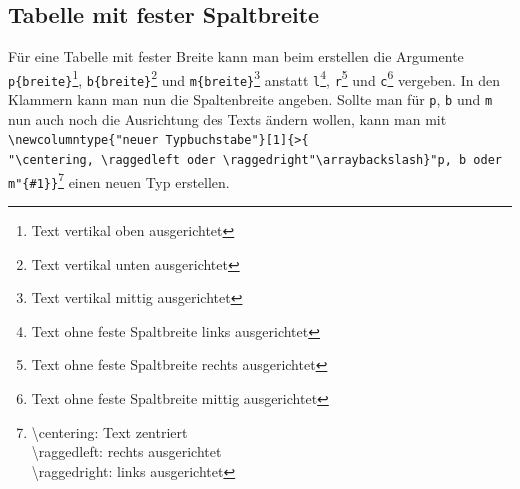 \documentclass[
12pt,
ngerman
]{scrreprt}
\begin{document}
\subsection{Tabelle mit fester Spaltbreite}
\label{subsec:table-col-fixed}
Für eine Tabelle mit fester Breite kann man beim erstellen die Argumente \verb!p{breite}!\footnote{Text vertikal oben ausgerichtet}, \verb!b{breite}!\footnote{Text vertikal unten ausgerichtet} und \verb!m{breite}!\footnote{Text vertikal mittig ausgerichtet} anstatt \verb!l!\footnote{\label{fn:tab-l}Text ohne feste Spaltbreite links ausgerichtet}, \verb!r!\footnote{\label{fn:tab-r}Text ohne feste Spaltbreite rechts ausgerichtet} und \verb!c!\footnote{\label{fn:tab-c}Text ohne feste Spaltbreite mittig ausgerichtet} vergeben. In den Klammern kann man nun die Spaltenbreite angeben. Sollte man für \verb!p!, \verb!b! und \verb!m! nun auch noch die Ausrichtung des Texts ändern wollen, kann man mit \verb!\newcolumntype{"neuer Typbuchstabe"}[1]{>{! \\ \verb!"\centering, \raggedleft oder \raggedright"\arraybackslash}"p, b oder m"{#1}}!\footnote{\label{fn:text-alignment}\textbackslash centering: Text zentriert \\ \textbackslash raggedleft: rechts ausgerichtet \\ \textbackslash raggedright: links ausgerichtet
}
einen neuen Typ erstellen.
\end{document}

